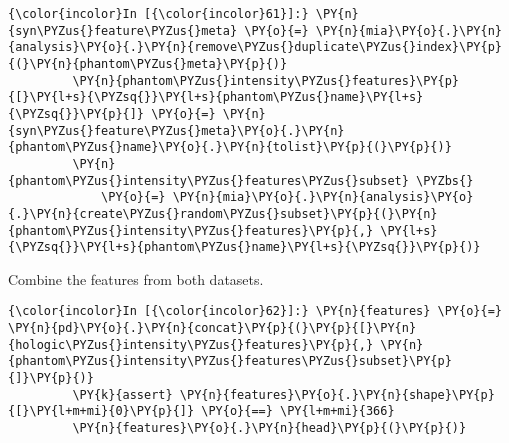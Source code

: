     \begin{Verbatim}[commandchars=\\\{\}]
{\color{incolor}In [{\color{incolor}61}]:} \PY{n}{syn\PYZus{}feature\PYZus{}meta} \PY{o}{=} \PY{n}{mia}\PY{o}{.}\PY{n}{analysis}\PY{o}{.}\PY{n}{remove\PYZus{}duplicate\PYZus{}index}\PY{p}{(}\PY{n}{phantom\PYZus{}meta}\PY{p}{)}
         \PY{n}{phantom\PYZus{}intensity\PYZus{}features}\PY{p}{[}\PY{l+s}{\PYZsq{}}\PY{l+s}{phantom\PYZus{}name}\PY{l+s}{\PYZsq{}}\PY{p}{]} \PY{o}{=} \PY{n}{syn\PYZus{}feature\PYZus{}meta}\PY{o}{.}\PY{n}{phantom\PYZus{}name}\PY{o}{.}\PY{n}{tolist}\PY{p}{(}\PY{p}{)}
         \PY{n}{phantom\PYZus{}intensity\PYZus{}features\PYZus{}subset} \PYZbs{}
             \PY{o}{=} \PY{n}{mia}\PY{o}{.}\PY{n}{analysis}\PY{o}{.}\PY{n}{create\PYZus{}random\PYZus{}subset}\PY{p}{(}\PY{n}{phantom\PYZus{}intensity\PYZus{}features}\PY{p}{,} \PY{l+s}{\PYZsq{}}\PY{l+s}{phantom\PYZus{}name}\PY{l+s}{\PYZsq{}}\PY{p}{)}
\end{Verbatim}

    Combine the features from both datasets.

    \begin{Verbatim}[commandchars=\\\{\}]
{\color{incolor}In [{\color{incolor}62}]:} \PY{n}{features} \PY{o}{=} \PY{n}{pd}\PY{o}{.}\PY{n}{concat}\PY{p}{(}\PY{p}{[}\PY{n}{hologic\PYZus{}intensity\PYZus{}features}\PY{p}{,} \PY{n}{phantom\PYZus{}intensity\PYZus{}features\PYZus{}subset}\PY{p}{]}\PY{p}{)}
         \PY{k}{assert} \PY{n}{features}\PY{o}{.}\PY{n}{shape}\PY{p}{[}\PY{l+m+mi}{0}\PY{p}{]} \PY{o}{==} \PY{l+m+mi}{366}
         \PY{n}{features}\PY{o}{.}\PY{n}{head}\PY{p}{(}\PY{p}{)}
\end{Verbatim}

